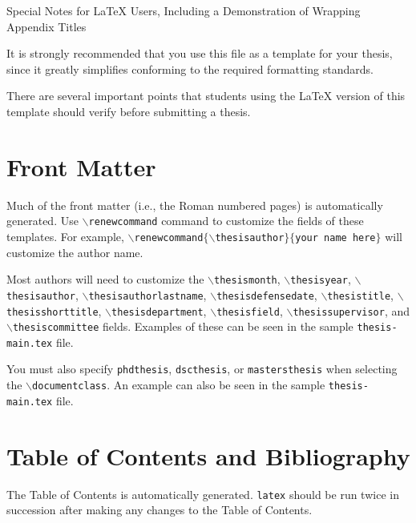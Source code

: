 {Special Notes for \LaTeX{} Users, Including a Demonstration of Wrapping Appendix Titles}
\label{app:latex-notes}

\newcommand{\cmd}[1]{\texttt{$\backslash$#1}}

It is strongly recommended that you use this file as a template for your
thesis, since it greatly simplifies conforming to the required formatting
standards.

There are several important points that students using the \LaTeX{} version of
this template should verify before submitting a thesis.

\section{Front Matter}

Much of the front matter (i.e., the Roman numbered pages) is automatically
generated.  Use \cmd{renewcommand} command to customize the fields of these
templates.  For example,
\texttt{\cmd{renewcommand}$\{$\cmd{thesisauthor}$\}\{$your name here$\}$} will
customize the author name.

\sloppy
Most authors will need to customize the \cmd{thesismonth}, \cmd{thesisyear},
\cmd{thesisauthor}, \cmd{thesisauthorlastname}, \cmd{thesisdefensedate},
\cmd{thesistitle}, \cmd{thesisshorttitle}, \cmd{thesisdepartment},
\cmd{thesisfield}, \cmd{thesissupervisor}, and \cmd{thesiscommittee}
fields.  Examples of these can be seen in the sample \texttt{thesis-main.tex}
file.

\fussy
You must also specify \texttt{phdthesis}, \texttt{dscthesis}, or
\texttt{mastersthesis} when selecting the \cmd{documentclass}.  An
example can also be seen in the sample \texttt{thesis-main.tex} file.

\section{Table of Contents and Bibliography}

The Table of Contents is automatically generated.  \texttt{latex} should be run
twice in succession after making any changes to the Table of Contents.

